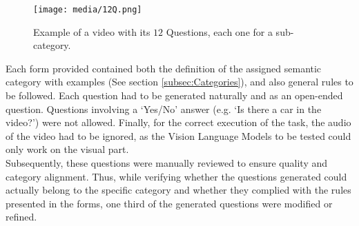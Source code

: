 \begin{figure*}[h]
    \centering
  \texttt{[image: media/12Q.png]}
  \caption{Example of a video with its $12$ Questions, each one for a sub-category.}
  \label{fig:Video+Q}
\end{figure*}
Each form provided contained both the definition of the assigned semantic category with examples (See section \ref{subsec:Categories}), and also general rules to be followed. Each question had to be generated naturally and as an open-ended question. Questions involving a ‘Yes/No’ answer (e.g. ‘Is there a car in the video?’) were not allowed. Finally, for the correct execution of the task, the audio of the video had to be ignored, as the Vision Language Models to be tested could only work on the visual part.\\
Subsequently, these questions were manually reviewed to ensure quality and category alignment. Thus, while verifying whether the questions generated could actually belong to the specific category and whether they complied with the rules presented in the forms, one third of the generated questions were modified or refined.

